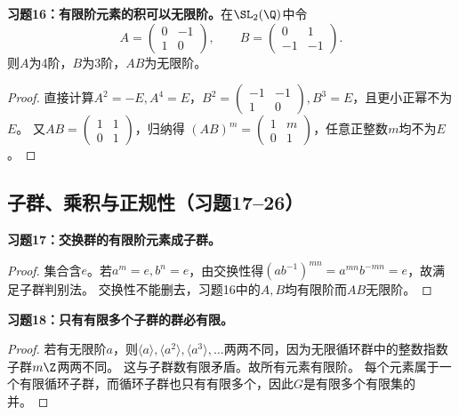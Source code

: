 \begin{problem}
\textbf{习题16：有限阶元素的积可以无限阶。}在$\SL_2(\Q)$中令
\[
A=\begin{pmatrix}0&-1\\1&0\end{pmatrix},\qquad B=\begin{pmatrix}0&1\\-1&-1\end{pmatrix}.
\]
则$A$为4阶，$B$为3阶，$AB$为无限阶。
\end{problem}
\begin{proof}
直接计算$A^2=-E,A^4=E$，$B^2=\left(\begin{smallmatrix}-1&-1\\1&0\end{smallmatrix}\right),B^3=E$，且更小正幂不为$E$。
又$AB=\left(\begin{smallmatrix}1&1\\0&1\end{smallmatrix}\right)$，归纳得
$(AB)^m=\left(\begin{smallmatrix}1&m\\0&1\end{smallmatrix}\right)$，任意正整数$m$均不为$E$。
\end{proof}

\subsection*{子群、乘积与正规性（习题17--26）}

\begin{problem}
\textbf{习题17：交换群的有限阶元素成子群。}
\end{problem}
\begin{proof}
集合含$e$。若$a^m=e,b^n=e$，由交换性得$(ab^{-1})^{mn}=a^{mn}b^{-mn}=e$，故满足子群判别法。
交换性不能删去，习题16中的$A,B$均有限阶而$AB$无限阶。
\end{proof}

\begin{problem}
\textbf{习题18：只有有限多个子群的群必有限。}
\end{problem}
\begin{proof}
若有无限阶$a$，则$\langle a\rangle,\langle a^2\rangle,\langle a^3\rangle,\ldots$两两不同，因为无限循环群中的整数指数子群$m\Z$两两不同。
这与子群数有限矛盾。故所有元素有限阶。
每个元素属于一个有限循环子群，而循环子群也只有有限多个，因此$G$是有限多个有限集的并。
\end{proof}

